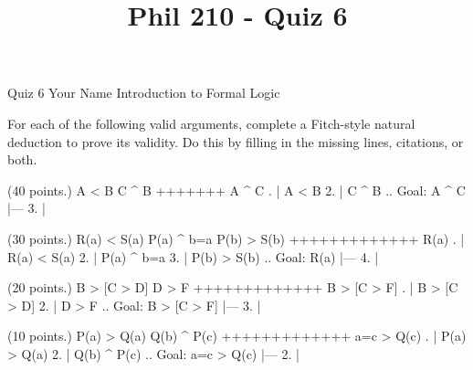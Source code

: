 
\title{Phil 210 - Quiz 6}

\heading
Quiz 6
Your Name
Introduction to Formal Logic
\endheading

For each of the following valid arguments, complete a Fitch-style natural deduction to prove its validity. Do this by filling in the missing lines, citations, or both.

\problems
{} (40 points.)
\argument
 A < B
 C ^ B
+++++++
 A ^ C
\endargument
        \answer
        . | A < B
         2. | C ^ B  ..  Goal: A ^ C
            |---
         3. | 
        \endfitchproof
        \endanswer

 (30 points.)
\argument
 R(a) < S(a)
 P(a) ^ b=a
 P(b) > S(b)
+++++++++++++
 R(a)
\endargument
        \answer
        . | R(a) < S(a)
         2. | P(a) ^ b=a
         3. | P(b) > S(b)  ..  Goal: R(a)
            |---
         4. | 
        \endfitchproof
        \endanswer

 (20 points.)
\argument
 B > [C > D]
 D > F
+++++++++++++
 B > [C > F]
\endargument
        \answer
        . | B > [C > D]
         2. | D > F        ..  Goal: B > [C > F]
            |---
         3. | 
        \endfitchproof
        \endanswer

 (10 points.)
\argument
 P(a) > Q(a)
 Q(b) ^ P(c)
+++++++++++++
 a=c > Q(c)
\endargument
        \answer
        . | P(a) > Q(a)
         2. | Q(b) ^ P(c)  ..  Goal: a=c > Q(c)
            |---
         2. | 
        \endfitchproof
        \endanswer

\endproblems
\bye
